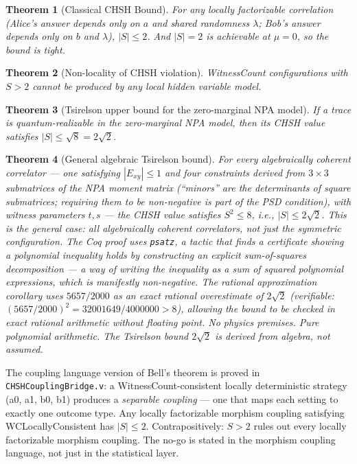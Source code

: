 \documentclass[11pt,a4paper]{article}
\theoremstyle{plain}
\newtheorem{theorem}{Theorem}[section]
\theoremstyle{definition}
\theoremstyle{remark}
\begin{document}
\begin{theorem}[Classical CHSH Bound]
For any locally factorizable correlation (Alice's answer depends only on $a$ and shared randomness $\lambda$; Bob's answer depends only on $b$ and $\lambda$), $|S| \leq 2$. And $|S| = 2$ is achievable at $\mu = 0$, so the bound is tight.
\end{theorem}

\begin{theorem}[Non-locality of CHSH violation]
WitnessCount configurations with $S > 2$ cannot be produced by any local hidden variable model.
\end{theorem}

\begin{theorem}[Tsirelson upper bound for the zero-marginal NPA model]
If a trace is quantum-realizable in the zero-marginal NPA model, then its CHSH value satisfies $|S| \leq \sqrt{8} = 2\sqrt{2}$.
\end{theorem}

\begin{theorem}[General algebraic Tsirelson bound]
\label{thm:general_algebraic_tsirelson}
For every algebraically coherent correlator --- one satisfying $|E_{xy}| \leq 1$ and four constraints derived from $3 \times 3$ submatrices of the NPA moment matrix (``minors'' are the determinants of square submatrices; requiring them to be non-negative is part of the PSD condition), with witness parameters $t, s$ --- the CHSH value satisfies $S^2 \leq 8$, i.e., $|S| \leq 2\sqrt{2}$.
This is the \emph{general} case: all algebraically coherent correlators, not just the symmetric configuration. The Coq proof uses \texttt{psatz}, a tactic that finds a certificate showing a polynomial inequality holds by constructing an explicit sum-of-squares decomposition --- a way of writing the inequality as a sum of squared polynomial expressions, which is manifestly non-negative. The rational approximation corollary uses $5657/2000$ as an exact rational overestimate of $2\sqrt{2}$ (verifiable: $(5657/2000)^2 = 32001649/4000000 > 8$), allowing the bound to be checked in exact rational arithmetic without floating point. No physics premises. Pure polynomial arithmetic. The Tsirelson bound $2\sqrt{2}$ is derived from algebra, not assumed.
\end{theorem}

The coupling language version of Bell's theorem is proved in \texttt{CHSHCouplingBridge.v}: a WitnessCount-consistent locally deterministic strategy (a0, a1, b0, b1) produces a \emph{separable coupling} — one that maps each setting to exactly one outcome type. Any locally factorizable morphism coupling satisfying WCLocallyConsistent has $|S| \leq 2$. Contrapositively: $S > 2$ rules out every locally factorizable morphism coupling. The no-go is stated in the morphism coupling language, not just in the statistical layer.
\end{document}
